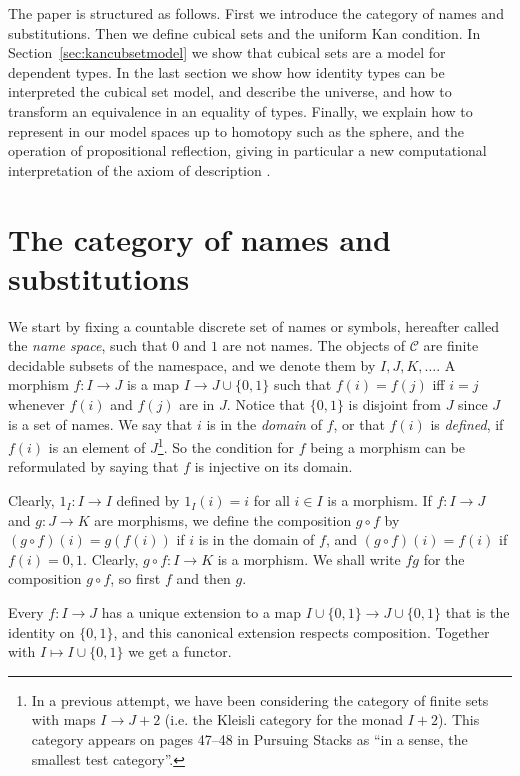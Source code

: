 \documentclass[10pt,a4paper]{article}
\newcommand{\CC}{{\mathcal C}}
\newcommand{\set}[1]{\{#1\}}
\begin{document}
The paper is structured as follows. First we introduce the category of
names and substitutions.  Then we define cubical sets and the uniform
Kan condition.  In Section~\ref{sec:kancubsetmodel} we show that cubical
sets are a model for dependent types.  In the last section we show how
identity types can be interpreted the cubical set model, and describe
the universe, and how to transform an equivalence in an equality of
types.  Finally, we explain how to represent in our model spaces up to
homotopy such as the sphere, and the operation of propositional
reflection, giving in particular a new computational interpretation of
the axiom of description \cite{Russell}.

\section{The category of names and substitutions}

 We start by fixing a countable discrete set of names or symbols, hereafter called the \emph{name space},
such that $0$ and $1$ are not names.
The objects of $\CC$ are finite decidable subsets of the namespace,
and we denote them by $I,J,K,\dots$.
A morphism $f:I\to J$ is a map $I \to J\cup \set{0,1}$ such that $f(i) = f(j)$ iff $i=j$ whenever
$f(i)$ and $f(j)$ are in $J$. Notice that $\set{0,1}$ is disjoint from $J$ since $J$ is a set of
names. We say that $i$ is in the \emph{domain} of $f$, or that $f(i)$ is \emph{defined},
if $f(i)$ is an element of $J$\footnote%
{In a previous attempt, we have been considering the category of finite sets
with maps $I \to J+2$ (i.e. the Kleisli category for the monad $I+2$).
This category appears on pages 47--48 in Pursuing Stacks
\cite{Grothendieck} as ``in a sense, the smallest test category''.}.
So the condition for $f$ being a morphism can be reformulated by saying that $f$ is injective on its domain.

Clearly, $1_I : I\to I$ defined by $1_I(i) = i$ for all $i\in I$ is a morphism.
If $f:I\to J$ and $g:J\to K$ are morphisms, we define the composition $g\circ f$ by
$(g\circ f)(i) = g(f(i))$ if $i$ is in the domain of $f$, and $(g\circ f)(i) = f(i)$ if $f(i)= 0,1$.
Clearly, $g\circ f: I\to K$ is a morphism.
We shall write $fg$ for the composition $g\circ f$, so first $f$ and then $g$.

Every $f:I\to J$ has a unique extension to a map $I \cup \set{0,1} \to J\cup \set{0,1}$
that is the identity on $\set{0,1}$, and this canonical extension respects composition.
Together with $I\mapsto I \cup \set{0,1}$ we get a functor.%
\end{document}

